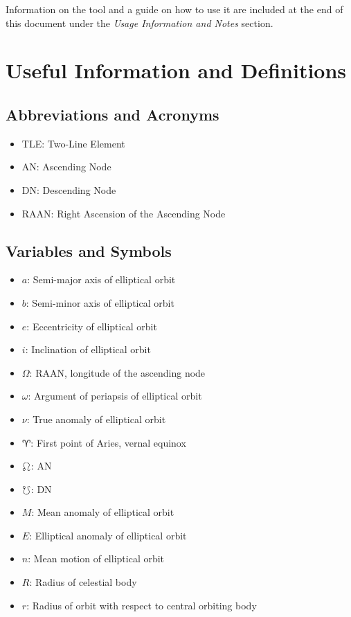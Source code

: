 \documentclass[conference]{IEEEtran}
\begin{document}
		Information on the tool and a guide on how to use it are included at the end of this document under the \textit{Usage Information and Notes} section.

	\section{Useful Information and Definitions}

		\subsection{Abbreviations and Acronyms}\label{AA}
			\begin{itemize}
				\item TLE: Two-Line Element
				\item AN: Ascending Node
				\item DN: Descending Node
				\item RAAN: Right Ascension of the Ascending Node
			\end{itemize}

		\subsection{Variables and Symbols}
			\begin{itemize}
				\item \( a \): Semi-major axis of elliptical orbit
				\item \( b \): Semi-minor axis of elliptical orbit
				\item \( e \): Eccentricity of elliptical orbit
				\item \( i \): Inclination of elliptical orbit
				\item \( \Omega \): RAAN, longitude of the ascending node
				\item \( \omega \): Argument of periapsis of elliptical orbit
				\item \( \nu \): True anomaly of elliptical orbit
				\item \( \aries \): First point of Aries, vernal equinox
				\item \( \ascnode \): AN
				\item \( \descnode \): DN
				\item \( M \): Mean anomaly of elliptical orbit
				\item \( E \): Elliptical anomaly of elliptical orbit
				\item \( n \): Mean motion of elliptical orbit
				\item \( R \): Radius of celestial body
				\item \( r \): Radius of orbit with respect to central orbiting body
			\end{itemize}
\end{document}
